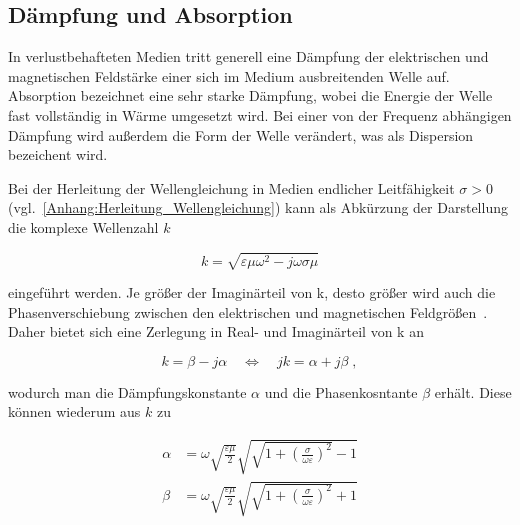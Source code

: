 \subsection{Dämpfung und Absorption}\label{cha:2_sub_Daempfung_und_Absorption}
In verlustbehafteten Medien tritt generell eine Dämpfung der elektrischen und magnetischen Feldstärke einer sich im Medium ausbreitenden Welle auf. Absorption bezeichnet eine sehr starke Dämpfung, wobei die Energie der Welle fast vollständig in Wärme umgesetzt wird. Bei einer von der Frequenz abhängigen Dämpfung wird außerdem die Form der Welle verändert, was als Dispersion bezeichent wird. 
\par
\vspace{\linespace}
Bei der Herleitung der Wellengleichung in Medien endlicher Leitfähigkeit $\sigma > 0$ (vgl.~\Anhang \ref{Anhang:Herleitung_Wellengleichung}) kann als Abkürzung der Darstellung die komplexe Wellenzahl $k$

\begin{equation}
    k = \sqrt{\varepsilon \mu \omega^2 - j \omega \sigma \mu}
\end{equation}

eingeführt werden. Je größer der Imaginärteil von k, desto größer wird auch die Phasenverschiebung zwischen den elektrischen und magnetischen Feldgrößen~\cite{EM_Schirmung}. Daher bietet sich eine Zerlegung in Real- und Imaginärteil von k an

\begin{equation}
    k = \beta - j \alpha \quad \Leftrightarrow \quad jk = \alpha + j\beta \; ,
\end{equation}

wodurch man die Dämpfungskonstante $\alpha$ und die Phasenkosntante $\beta$ erhält. Diese können wiederum aus $k$ zu

\begin{align}
    \alpha &= \omega \sqrt{\frac{\varepsilon \mu}{2}} \sqrt{\sqrt{1+\left(\frac{\sigma}{\omega\varepsilon}\right)^2}-1} \\
    \beta &= \omega \sqrt{\frac{\varepsilon \mu}{2}} \sqrt{\sqrt{1+\left(\frac{\sigma}{\omega\varepsilon}\right)^2}+1}
\end{align}

